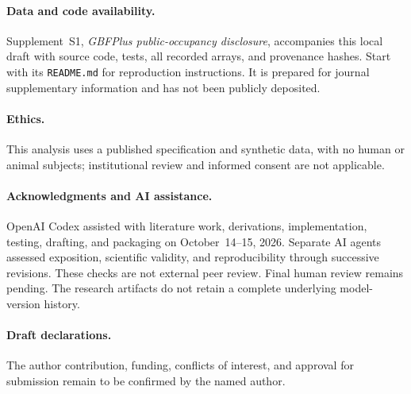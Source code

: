 \paragraph{Data and code availability.}
Supplement~S1, \emph{GBFPlus public-occupancy disclosure}, accompanies this local
draft with source code, tests, all recorded arrays, and provenance hashes.
Start with its \texttt{README.md} for reproduction instructions. It is prepared for
journal supplementary information and has not been publicly deposited.

\paragraph{Ethics.}
This analysis uses a published specification and synthetic data, with no human
or animal subjects; institutional review and informed consent are not applicable.

\paragraph{Acknowledgments and AI assistance.}
OpenAI Codex assisted with literature work, derivations, implementation, testing,
drafting, and packaging on October~14--15, 2026. Separate AI agents assessed
exposition, scientific validity, and reproducibility through successive revisions.
These checks are not external peer review. Final human review remains pending.
The research artifacts do not retain a complete underlying model-version history.

\paragraph{Draft declarations.}
The author contribution, funding, conflicts of interest, and approval for
submission remain to be confirmed by the named author.
